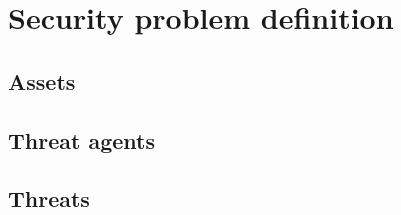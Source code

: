 \documentclass[10pt]{article}
\begin{document}
  \section{Security problem definition}

    \subsection{Assets}

    \subsection{Threat agents}

    \subsection{Threats}
\end{document}
